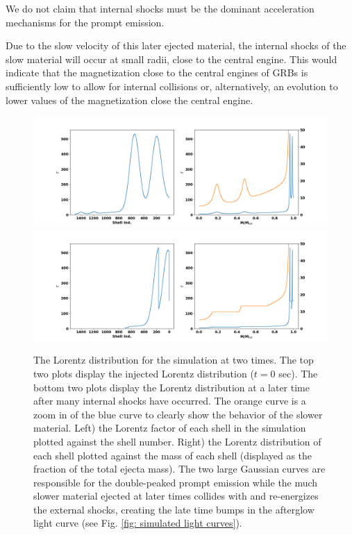 \documentclass[linenumbers]{aastex631}
\begin{document}
We do not claim that internal shocks must be the dominant acceleration mechanisms for the prompt emission. 

Due to the slow velocity of this later ejected material, the internal shocks of the slow material will occur at small radii, close to the central engine. This would indicate that the magnetization close to the central engines of GRBs is sufficiently low to allow for internal collisions or, alternatively, an evolution to lower values of the magnetization close the central engine.

\begin{figure}[!ht]
    \centering
    \includegraphics[width=1\textwidth]{figures/22-03-09-gauss-inject-with-zoom-T0.png}
    \includegraphics[width=1\textwidth]{figures/22-03-09-gauss-inject-with-zoom-TLater.png}
    \caption{The Lorentz distribution for the simulation at two times. The top two plots display the injected Lorentz distribution ($t = 0$ sec). The bottom two plots display the Lorentz distribution at a later time after many internal shocks have occurred. The orange curve is a zoom in of the blue curve to clearly show the behavior of the slower material. Left) the Lorentz factor of each shell in the simulation plotted against the shell number. Right) the Lorentz distribution of each shell plotted against the mass of each shell (displayed as the fraction of the total ejecta mass). The two large Gaussian curves are responsible for the double-peaked prompt emission while the much slower material ejected at later times collides with and re-energizes the external shocks, creating the late time bumps in the afterglow light curve (see Fig. \ref{fig: simulated light curves}).}
    \label{fig: simulated lorentz dist}
\end{figure}
\end{document}
